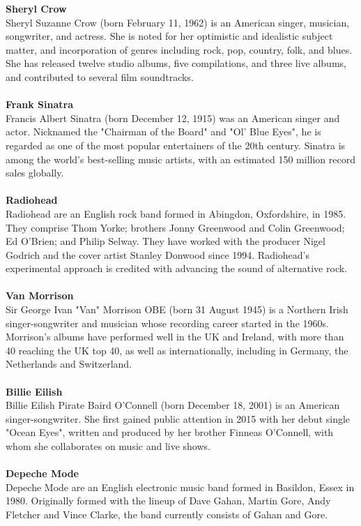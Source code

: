 \documentclass[fleqn]{jaes}
\begin{document}
\noindent\textbf{Sheryl Crow}\\Sheryl Suzanne Crow (born February 11, 1962) is an American singer, musician, songwriter, and actress. She is noted for her optimistic and idealistic subject matter, and incorporation of genres including rock, pop, country, folk, and blues. She has released twelve studio albums, five compilations, and three live albums, and contributed to several film soundtracks.
\\\\
\noindent\textbf{Frank Sinatra}\\Francis Albert Sinatra (born December 12, 1915) was an American singer and actor. Nicknamed the "Chairman of the Board" and "Ol' Blue Eyes", he is regarded as one of the most popular entertainers of the 20th century. Sinatra is among the world's best-selling music artists, with an estimated 150 million record sales globally.
\\\\
\noindent\textbf{Radiohead}\\Radiohead are an English rock band formed in Abingdon, Oxfordshire, in 1985. They comprise Thom Yorke; brothers Jonny Greenwood and Colin Greenwood; Ed O'Brien; and Philip Selway. They have worked with the producer Nigel Godrich and the cover artist Stanley Donwood since 1994. Radiohead's experimental approach is credited with advancing the sound of alternative rock.
\\\\
\noindent\textbf{Van Morrison}\\Sir George Ivan "Van" Morrison OBE (born 31 August 1945) is a Northern Irish singer-songwriter and musician whose recording career started in the 1960s. Morrison's albums have performed well in the UK and Ireland, with more than 40 reaching the UK top 40, as well as internationally, including in Germany, the Netherlands and Switzerland.
\\\\
\noindent\textbf{Billie Eilish}\\Billie Eilish Pirate Baird O'Connell (born December 18, 2001) is an American singer-songwriter. She first gained public attention in 2015 with her debut single "Ocean Eyes", written and produced by her brother Finneas O'Connell, with whom she collaborates on music and live shows.
\\\\
\noindent\textbf{Depeche Mode}\\Depeche Mode are an English electronic music band formed in Basildon, Essex in 1980. Originally formed with the lineup of Dave Gahan, Martin Gore, Andy Fletcher and Vince Clarke, the band currently consists of Gahan and Gore.
\\\\
\end{document}
